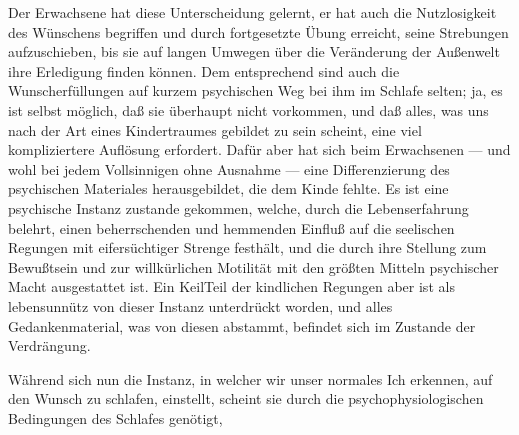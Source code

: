 \documentclass{article}
\begin{document}
            
        \pstart
        Der Erwachsene hat diese Unterscheidung gelernt, er hat auch die Nutzlosigkeit
               des Wünschens begriffen und durch fortgesetzte Übung erreicht, seine Strebungen
               aufzuschieben, bis sie auf langen Umwegen über die Veränderung der Außenwelt
               ihre Erledigung finden können. Dem entsprechend sind auch die
               Wunscherfüllungen auf kurzem psychischen Weg bei ihm im Schlafe selten; ja,
               es ist selbst möglich, daß sie überhaupt nicht vorkommen, und daß alles,
               was uns nach der Art eines Kindertraumes gebildet zu sein scheint, eine viel
               kompliziertere Auflösung erfordert. Dafür aber hat sich beim Erwachsenen — und
               wohl bei jedem Vollsinnigen ohne Ausnahme — eine Differenzierung des psychischen
               Materiales herausgebildet, die dem Kinde fehlte. Es ist eine psychische
               Instanz zustande gekommen, welche, durch die Lebenserfahrung belehrt, einen
               beherrschenden und hemmenden Einfluß auf die seelischen Regungen mit
               eifersüchtiger Strenge festhält, und die durch ihre Stellung zum Bewußtsein und
               zur willkürlichen Motilität mit den größten Mitteln psychischer Macht
               ausgestattet ist. Ein KeilTeil der kindlichen Regungen aber ist als
               lebensunnütz von dieser Instanz unterdrückt worden, und alles Gedankenmaterial, was von diesen abstammt, befindet sich im Zustande der
               Verdrängung.
        \pend
    
            
        \pstart
        Während sich nun die Instanz, in welcher wir unser normales Ich erkennen, auf
               den Wunsch zu schlafen, einstellt, scheint sie durch die psychophysiologischen
               Bedingungen des Schlafes genötigt,
        \pend
    
         
            
            
            
\end{document}
